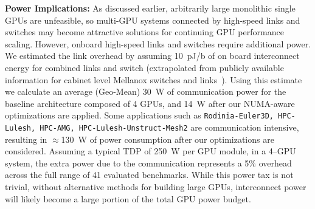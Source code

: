 \textbf{Power Implications:} As discussed earlier, arbitrarily large monolithic 
single GPUs are unfeasible, so multi-GPU systems connected by 
high-speed links and switches may become attractive solutions for continuing 
GPU performance scaling. However, onboard high-speed links and switches 
require additional power. We estimated the link overhead by assuming \SI{10}{pJ/b} of 
on board interconnect energy for combined links and switch (extrapolated from 
publicly available information for cabinet level Mellanox switches and 
links~\cite{mlswitch,mlnic}). Using this estimate we calculate an average 
(Geo-Mean) \SI{30}{W} of communication power for the baseline 
architecture composed of 4 GPUs, and \SI{14}{W} after 
our NUMA-aware optimizations are applied. Some applications such as 
\texttt{Rodinia-Euler3D, HPC-Lulesh, HPC-AMG, HPC-Lulesh-Unstruct-Mesh2} are 
communication intensive, resulting in $\approx$\SI{130}{W} of power consumption after our 
optimizations are considered. Assuming a typical TDP of \SI{250}{W} per GPU module, 
in a 4--GPU system, the extra power due to the communication represents a 5\% 
overhead across the full range of 41 evaluated benchmarks. While this power
tax is not trivial, without alternative methods for building large
GPUs, interconnect power will likely become a large portion of the total
GPU power budget.
